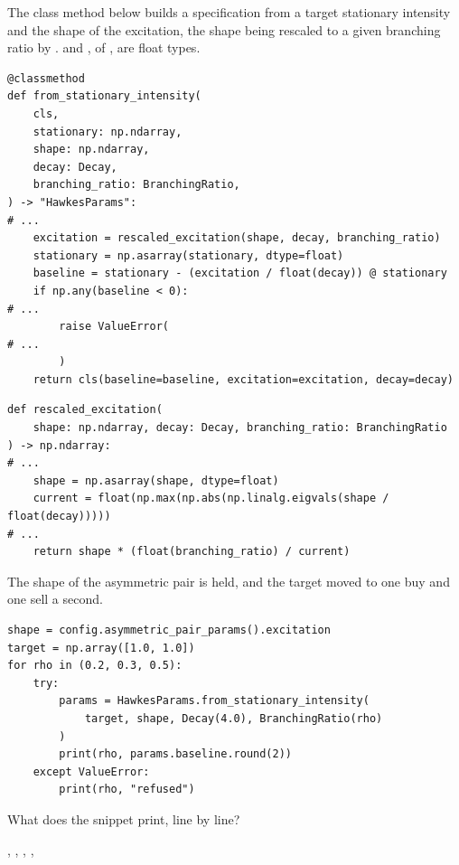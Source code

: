 \begin{question}
\label{question.balancedTargetOnTheAsymmetricShape}
The class method below builds a specification
from a target stationary intensity and the shape of the excitation,
the shape being rescaled to a given branching ratio by .
 and , of , are float types.
\begin{lstlisting}[caption={\protect\codehl{unito26.lob.hawkes.HawkesParams.from\_stationary\_intensity}, abridged.}, label=listing.balancedTargetFromStationaryIntensity]
@classmethod
def from_stationary_intensity(
    cls,
    stationary: np.ndarray,
    shape: np.ndarray,
    decay: Decay,
    branching_ratio: BranchingRatio,
) -> "HawkesParams":
# ...
    excitation = rescaled_excitation(shape, decay, branching_ratio)
    stationary = np.asarray(stationary, dtype=float)
    baseline = stationary - (excitation / float(decay)) @ stationary
    if np.any(baseline < 0):
# ...
        raise ValueError(
# ...
        )
    return cls(baseline=baseline, excitation=excitation, decay=decay)
\end{lstlisting}
\begin{lstlisting}[caption={\protect\codehl{unito26.lob.hawkes.rescaled\_excitation}, abridged.}, label=listing.balancedTargetRescaledExcitation]
def rescaled_excitation(
    shape: np.ndarray, decay: Decay, branching_ratio: BranchingRatio
) -> np.ndarray:
# ...
    shape = np.asarray(shape, dtype=float)
    current = float(np.max(np.abs(np.linalg.eigvals(shape / float(decay)))))
# ...
    return shape * (float(branching_ratio) / current)
\end{lstlisting}
The shape of the asymmetric pair is held,
and the target moved to one buy and one sell a second.
\begin{lstlisting}[caption={A balanced target on a ladder of branching ratios}, label=listing.balancedTargetOnTheAsymmetricShapeRun]
shape = config.asymmetric_pair_params().excitation
target = np.array([1.0, 1.0])
for rho in (0.2, 0.3, 0.5):
    try:
        params = HawkesParams.from_stationary_intensity(
            target, shape, Decay(4.0), BranchingRatio(rho)
        )
        print(rho, params.baseline.round(2))
    except ValueError:
        print(rho, "refused")
\end{lstlisting}
What does the snippet print, line by line?
\begin{choices}
 \correctchoice {}, , 
 \choice {}, , 

\end{choices}
\end{question}
